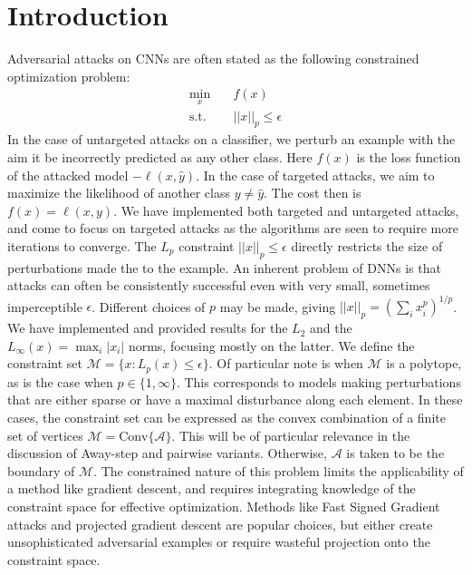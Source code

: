 \documentclass{article}
\begin{document}
\section{Introduction}
Adversarial attacks on CNNs are often stated as the following constrained optimization problem:
\begin{equation}
\begin{aligned}
\min_x \quad & f(x)\\
\text{s.t.} \quad & ||x||_p \leq \epsilon
\end{aligned}
\end{equation}
In the case of untargeted attacks on a classifier, we perturb an example with the aim it be incorrectly predicted as any other class. Here $f(x)$ is the loss function of the attacked model $-\ell(x, \hat{y})$. In the case of targeted attacks, we aim to maximize the likelihood of another class $y \neq \hat{y}$. The cost then is $f(x) = \ell(x, y)$. We have implemented both targeted and untargeted attacks, and come to focus on targeted attacks as the algorithms are seen to require more iterations to converge. 
The $L_p$ constraint $||x||_p \leq \epsilon$ directly restricts the size of perturbations made the to the example. An inherent problem of DNNs is that attacks can often be consistently successful even with very small, sometimes imperceptible $\epsilon$. Different choices of $p$ may be made, giving $||x||_p = (\sum_i{x_i^p})^{1/p}$. We have implemented and provided results for the $L_2$ and the $L_\infty(x) = \max_i |x_i|$ norms, focusing mostly on the latter. 
We define the constraint set $\mathcal{M} = \{x : L_p(x) \leq \epsilon\}$. 
Of particular note is when $\mathcal{M}$ is a polytope, as is the case when $p \in \{1, \infty\}$. This corresponds to models making perturbations that are either sparse or have a maximal disturbance along each element. In these cases, the constraint set can be expressed as the convex combination of a finite set of vertices $\mathcal{M} = \text{Conv}\{\mathcal{A}\}$. This will be of particular relevance in the discussion of Away-step and pairwise variants. Otherwise, $\mathcal{A}$ is taken to be the boundary of $\mathcal{M}$.\break
The constrained nature of this problem limits the applicability of a method like gradient descent, and requires integrating knowledge of the constraint space for effective optimization. Methods like Fast Signed Gradient attacks and projected gradient descent are popular choices, but either create unsophisticated adversarial examples or require wasteful projection onto the constraint space. 
\end{document}
